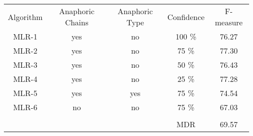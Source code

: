 \begin{center}
\begin{tabular}{|c|c|c|c|c|}
	\cline{1-5}
	Algorithm & Anaphoric Chains & Anaphoric Type& Confidence & F-measure \\ \cline{1-5}
	\cline{1-5}
	MLR-1 & yes & no & 100 \% &  76.27 \\ \cline{1-5}
	MLR-2 & yes & no & 75 \% & 77.30 \\ \cline{1-5}
	MLR-3 & yes & no & 50 \% & 76.43 \\ \cline{1-5}
	MLR-4 & yes & no & 25 \% & 77.28 \\ \cline{1-5}
	MLR-5 & yes & yes & 75 \% & 74.54 \\ \cline{1-5}
	MLR-6 & no & no & 75 \% & 67.03 \\ \cline{1-5}
	\multicolumn{5}{r}{}\\ \cline{4-5}
	\multicolumn{2}{r}{} & &  MDR & 69.57 \\
\cline{4-5}
	\end{tabular}
 \label{table:aone1995evals}
\end{center}

